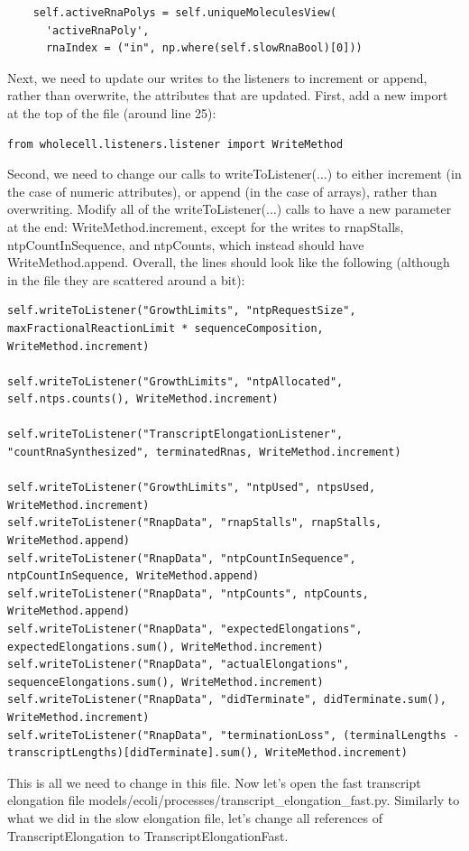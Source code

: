 \documentclass[12pt]{article}
\begin{document}
\begin{lstlisting}
    self.activeRnaPolys = self.uniqueMoleculesView(
      'activeRnaPoly',
      rnaIndex = ("in", np.where(self.slowRnaBool)[0]))
\end{lstlisting}

Next, we need to update our writes to the listeners to increment or append, rather than overwrite, the attributes that are updated. First, add a new import at the top of the file (around line 25):
\begin{lstlisting}
from wholecell.listeners.listener import WriteMethod
\end{lstlisting}

Second, we need to change our calls to writeToListener(...) to either increment (in the case of numeric attributes), or append (in the case of arrays), rather than overwriting. Modify all of the writeToListener(...) calls to have a new parameter at the end:  WriteMethod.increment, except for the writes to rnapStalls, ntpCountInSequence, and ntpCounts, which instead should have WriteMethod.append. Overall, the lines should look like the following (although in the file they are scattered around a bit):
\begin{lstlisting}
self.writeToListener("GrowthLimits", "ntpRequestSize", maxFractionalReactionLimit * sequenceComposition, WriteMethod.increment)

self.writeToListener("GrowthLimits", "ntpAllocated", self.ntps.counts(), WriteMethod.increment)

self.writeToListener("TranscriptElongationListener", "countRnaSynthesized", terminatedRnas, WriteMethod.increment)

self.writeToListener("GrowthLimits", "ntpUsed", ntpsUsed, WriteMethod.increment)
self.writeToListener("RnapData", "rnapStalls", rnapStalls, WriteMethod.append)
self.writeToListener("RnapData", "ntpCountInSequence", ntpCountInSequence, WriteMethod.append)
self.writeToListener("RnapData", "ntpCounts", ntpCounts, WriteMethod.append)
self.writeToListener("RnapData", "expectedElongations", expectedElongations.sum(), WriteMethod.increment)
self.writeToListener("RnapData", "actualElongations", sequenceElongations.sum(), WriteMethod.increment)
self.writeToListener("RnapData", "didTerminate", didTerminate.sum(), WriteMethod.increment)
self.writeToListener("RnapData", "terminationLoss", (terminalLengths - transcriptLengths)[didTerminate].sum(), WriteMethod.increment)
\end{lstlisting}

This is all we need to change in this file. Now let’s open the fast transcript elongation file models/ecoli/processes/transcript\_elongation\_fast.py. Similarly to what we did in the slow elongation file, let’s change all references of TranscriptElongation to TranscriptElongationFast.
\end{document}
